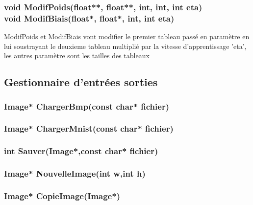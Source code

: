 \documentclass{article}
\begin{document}
			\subsubsection{\textcolor{myblue}{\textbf{void}} ModifPoids(\textcolor{myblue}{\textbf{float**}},  \textcolor{myblue}{\textbf{float**}},  \textcolor{myblue}{\textbf{int}},  \textcolor{myblue}{\textbf{int}},  \textcolor{myblue}{\textbf{int}} eta)\\
			\textcolor{myblue}{\textbf{void}} ModifBiais(\textcolor{myblue}{\textbf{float*}},  \textcolor{myblue}{\textbf{float*}},  \textcolor{myblue}{\textbf{int}},  \textcolor{myblue}{\textbf{int}} eta)}
			ModifPoids et ModifBiais vont modifier le premier tableau passé en paramètre en lui soustrayant le deuxieme tableau multiplié par la vitesse d'apprentissage 'eta', les autres paramètre sont les tailles des tableaux
		
		
		
	\subsection{Gestionnaire d'entrées sorties}
		\subsubsection{\textcolor{myblue}{\textbf{Image*}} ChargerBmp(\textcolor{myblue}{\textbf{const char*}} fichier)}
		
		
		\subsubsection{\textcolor{myblue}{\textbf{Image*}} ChargerMnist(\textcolor{myblue}{\textbf{const char*}} fichier)}
		
		
		\subsubsection{\textcolor{myblue}{\textbf{int}} Sauver(\textcolor{myblue}{\textbf{Image*}},\textcolor{myblue}{\textbf{const char*}} fichier)}
		
		
		\subsubsection{\textcolor{myblue}{\textbf{Image*}} NouvelleImage(\textcolor{myblue}{\textbf{int}} w,\textcolor{myblue}{\textbf{int}} h)}
		
		
		\subsubsection{\textcolor{myblue}{\textbf{Image*}} CopieImage(\textcolor{myblue}{\textbf{Image*}})}
		
\end{document}
